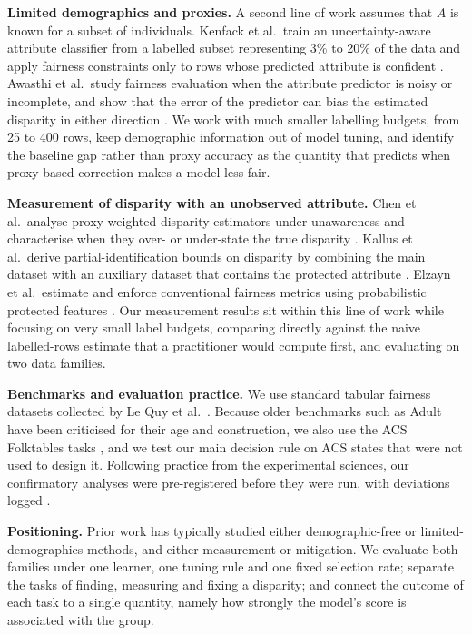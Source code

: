 \documentclass[conference]{IEEEtran}
\begin{document}
\textbf{Limited demographics and proxies.} A second line of work assumes that $A$ is known for a subset of individuals. Kenfack et al.\ train an uncertainty-aware attribute classifier from a labelled subset representing 3\% to 20\% of the data and apply fairness constraints only to rows whose predicted attribute is confident \cite{kenfack2024fairness}. Awasthi et al.\ study fairness evaluation when the attribute predictor is noisy or incomplete, and show that the error of the predictor can bias the estimated disparity in either direction \cite{awasthi2021evaluating}. We work with much smaller labelling budgets, from 25 to 400 rows, keep demographic information out of model tuning, and identify the baseline gap rather than proxy accuracy as the quantity that predicts when proxy-based correction makes a model less fair.

\textbf{Measurement of disparity with an unobserved attribute.} Chen et al.\ analyse proxy-weighted disparity estimators under unawareness and characterise when they over- or under-state the true disparity \cite{chen2019fairness}. Kallus et al.\ derive partial-identification bounds on disparity by combining the main dataset with an auxiliary dataset that contains the protected attribute \cite{kallus2022assessing}. Elzayn et al.\ estimate and enforce conventional fairness metrics using probabilistic protected features \cite{elzayn2023estimating}. Our measurement results sit within this line of work while focusing on very small label budgets, comparing directly against the naive labelled-rows estimate that a practitioner would compute first, and evaluating on two data families.

\textbf{Benchmarks and evaluation practice.} We use standard tabular fairness datasets collected by Le Quy et al.\ \cite{lequy2022survey}. Because older benchmarks such as Adult have been criticised for their age and construction, we also use the ACS Folktables tasks \cite{ding2021retiring}, and we test our main decision rule on ACS states that were not used to design it. Following practice from the experimental sciences, our confirmatory analyses were pre-registered before they were run, with deviations logged \cite{nosek2018preregistration}.

\textbf{Positioning.} Prior work has typically studied either demographic-free or limited-demographics methods, and either measurement or mitigation. We evaluate both families under one learner, one tuning rule and one fixed selection rate; separate the tasks of finding, measuring and fixing a disparity; and connect the outcome of each task to a single quantity, namely how strongly the model's score is associated with the group.
\end{document}
